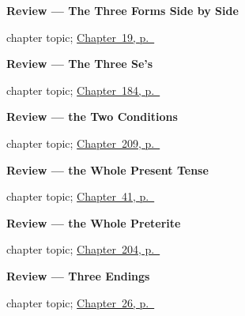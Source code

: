 \noindent\begin{minipage}[t]{\linewidth}
\raggedright
\textbf{Review --- The Three Forms Side by Side}\par
\footnotesize chapter topic; \hyperref[ch:review-ar-singular]{Chapter~19, p.~\pageref*{ch:review-ar-singular}}
\end{minipage}\par\smallskip

\noindent\begin{minipage}[t]{\linewidth}
\raggedright
\textbf{Review --- The Three Se's}\par
\footnotesize chapter topic; \hyperref[ch:review-three-se]{Chapter~184, p.~\pageref*{ch:review-three-se}}
\end{minipage}\par\smallskip

\noindent\begin{minipage}[t]{\linewidth}
\raggedright
\textbf{Review --- the Two Conditions}\par
\footnotesize chapter topic; \hyperref[ch:repaso-condiciones]{Chapter~209, p.~\pageref*{ch:repaso-condiciones}}
\end{minipage}\par\smallskip

\noindent\begin{minipage}[t]{\linewidth}
\raggedright
\textbf{Review --- the Whole Present Tense}\par
\footnotesize chapter topic; \hyperref[ch:spanish-review-present-complete]{Chapter~41, p.~\pageref*{ch:spanish-review-present-complete}}
\end{minipage}\par\smallskip

\noindent\begin{minipage}[t]{\linewidth}
\raggedright
\textbf{Review --- the Whole Preterite}\par
\footnotesize chapter topic; \hyperref[ch:repaso-preterito]{Chapter~204, p.~\pageref*{ch:repaso-preterito}}
\end{minipage}\par\smallskip

\noindent\begin{minipage}[t]{\linewidth}
\raggedright
\textbf{Review --- Three Endings}\par
\footnotesize chapter topic; \hyperref[ch:review-friends]{Chapter~26, p.~\pageref*{ch:review-friends}}
\end{minipage}\par\smallskip

